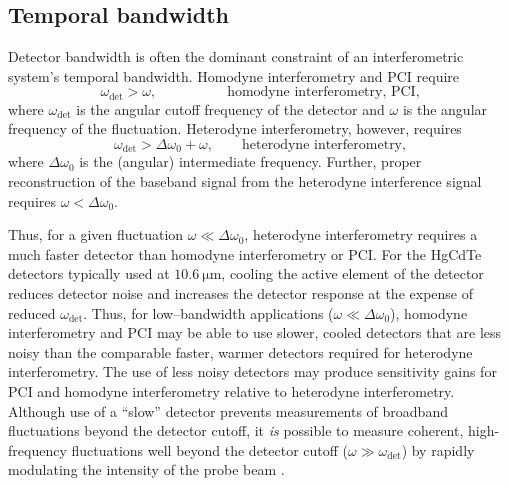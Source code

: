 \subsection{Temporal bandwidth}
\label{sec:InterferometricMethods:selection:temporal_bandwidth}
Detector bandwidth is often the dominant constraint
of an interferometric system's temporal bandwidth.
Homodyne interferometry and PCI require
\begin{equation}
  \omega_{\text{det}} > \omega,
  \qquad \qquad \quad%
  \text{homodyne interferometry, PCI,}
\end{equation}
where
$\omega_{\text{det}}$ is the angular cutoff frequency of the detector and
$\omega$ is the angular frequency of the fluctuation.
Heterodyne interferometry, however, requires
\begin{equation}
  \omega_{\text{det}} > \Delta \omega_0 + \omega,
  \qquad
  \text{heterodyne interferometry,}
\end{equation}
where $\Delta \omega_0$ is the (angular) intermediate frequency.
Further, proper reconstruction of the baseband signal
from the heterodyne interference signal requires $\omega < \Delta \omega_0$.

Thus, for a given fluctuation $\omega \ll \Delta \omega_0$,
heterodyne interferometry requires a much faster detector
than homodyne interferometry or PCI\@.
For the HgCdTe detectors typically used at $\SI{10.6}{\micro\meter}$,
cooling the active element of the detector
reduces detector noise and increases the detector response
at the expense of reduced $\omega_{\text{det}}$.
Thus, for low--bandwidth applications ($\omega \ll \Delta \omega_0$),
homodyne interferometry and PCI may be able to use
slower, cooled detectors that are less noisy than
the comparable faster, warmer detectors
required for heterodyne interferometry.
The use of less noisy detectors
may produce sensitivity gains for PCI and homodyne interferometry
relative to heterodyne interferometry.
Although use of a ``slow'' detector prevents measurements
of broadband fluctuations beyond the detector cutoff,
it \emph{is} possible to measure coherent, high-frequency fluctuations
well beyond the detector cutoff ($\omega \gg \omega_{\text{det}}$)
by rapidly modulating the intensity of the probe beam
\cite[Sec.~3.3.1]{tsujii_phd}.




